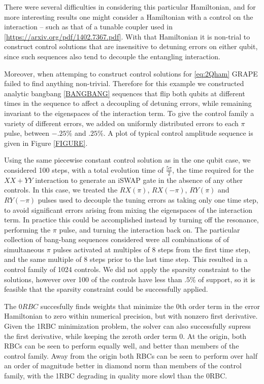 \documentclass[aps,nofootinbib,pra,notitlepage,twocolumn]{revtex4-1}
\begin{document}
There were several difficulties in considering this particular Hamiltonian, and for more interesting results one might consider a Hamiltonian with a control on the interaction -- such as that of a tunable coupler used in \ref{https://arxiv.org/pdf/1402.7367.pdf}. With that Hamiltonian it is non-trial to construct control solutions that are insensitive to detuning errors on either qubit, since such sequences also tend to decouple the entangling interaction.

Moreover, when attemping to construct control solutions for \ref{eq:2Qham} GRAPE failed to find anything non-trivial. Therefore for this example we constructed analytic bangbang \ref{BANGBANG} sequences that flip both qubits at different times in the sequence to affect a decoupling of detuning errors, while remaining invariant to the eigenspaces of the interaction term. To give the control family a variety of different errors, we added on uniformly distributed errors to each $\pi$ pulse, between $-.25$\% and $.25$\%. A plot of typical control amplitude sequence is given in Figure  \ref{FIGURE}.

Using the same piecewise constant control solution as in the one qubit case, we considered 100 steps, with a total evolution time of $\frac{5\pi}{2}$, the time required for the $XX + YY$ interaction to generate an iSWAP gate in the absence of any other controls. In this case, we treated the $RX(\pi)$, $RX(-\pi)$, $RY(\pi)$ and $RY(-\pi)$ pulses used to decouple the tuning errors as taking only one time step, to avoid significant errors arising from mixing the eigenspaces of the interaction term. In practice this could be accomplished instead by turning off the resonance, performing the $\pi$ pulse, and turning the interaction back on. The particular collection of bang-bang sequences considered were all combinations of of simultaneous $\pi$ pulses activated at multiples of $8$ steps from the first time step, and the same multiple of $8$ steps prior to the last time step. This resulted in a control family of 1024 controls. We did not apply the sparsity constraint to the solutions, however over 100 of the controls have less than $.5$\% of support, so it is feasible that the sparsity constraint could be successfully applied. 

The $0RBC$ succesfully finds weights that minimize the 0th order term in the error Hamiltonian to zero within numerical precision, but with nonzero first derivative. Given the 1RBC minimization problem, the solver can also successfully supress the first derivative, while keeping the zeroth order term 0. At the origin, both RBCs can be seen to perform equally well, and better than members of the control family. Away from the origin both RBCs can be seen to perform over half an order of magnitude better in diamond norm than members of the control family, with the 1RBC degrading in quality more slowl than the 0RBC.
\end{document}
